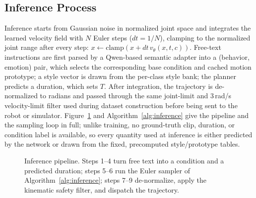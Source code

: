 \documentclass[conference]{IEEEtran}
\begin{document}
\subsection{Inference Process}
\label{sec:inference}

Inference starts from Gaussian noise in normalized joint space and
integrates the learned velocity field with $N$ Euler steps
($dt=1/N$), clamping to the normalized joint range after every step:
$x \leftarrow \mathrm{clamp}(x + dt\,v_\theta(x,t,c))$. Free-text
instructions are first parsed by a Qwen-based semantic adapter into a
(behavior, emotion) pair, which selects the corresponding base
condition and cached motion prototype; a style vector is drawn from the
per-class style bank; the planner predicts a duration, which sets $T$.
After integration, the trajectory is de-normalized to radians and
passed through the same joint-limit and 3\,rad/s velocity-limit filter
used during dataset construction before being sent to the robot or
simulator. Figure~\ref{fig:inference} and Algorithm~\ref{alg:inference}
give the pipeline and the sampling loop in full; unlike training, no
ground-truth clip, duration, or condition label is available, so every
quantity used at inference is either predicted by the network or drawn
from the fixed, precomputed style/prototype tables.

\begin{figure}[t]
\centering
{}
\caption{Inference pipeline. Steps 1--4 turn free text into a
condition and a predicted duration; steps 5--6 run the Euler sampler
of Algorithm~\ref{alg:inference}; steps 7--9 de-normalize, apply the
kinematic safety filter, and dispatch the trajectory.}
\label{fig:inference}
\end{figure}
\end{document}
